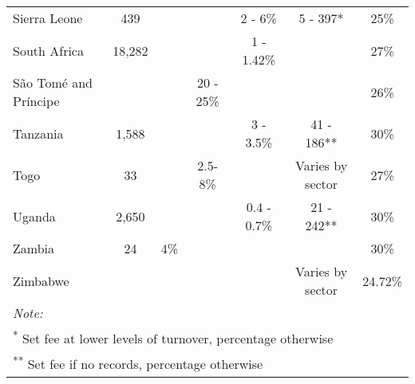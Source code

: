 \begin{tabular}{lcccccc}
Sierra Leone & 439 &  &  & 2 - 6\% & 5 - 397* & 25\%\\
South Africa & 18,282 &  &  & 1 - 1.42\% &  & 27\%\\
\addlinespace
São Tomé and Príncipe &  &  & 20 - 25\% &  &  & 26\%\\
Tanzania & 1,588 &  &  & 3 - 3.5\% & 41 - 186** & 30\%\\
Togo & 33 &  & 2.5- 8\% &  & Varies by sector & 27\%\\
Uganda & 2,650 &  &  & 0.4 - 0.7\% & 21 - 242** & 30\%\\
Zambia & 24 & 4\% &  &  &  & 30\%\\
\addlinespace
Zimbabwe &  &  &  &  & Varies by sector & 24.72\%\\
\bottomrule
\multicolumn{7}{l}{\rule{0pt}{1em}\textit{Note: }} \\
\multicolumn{7}{l}{\rule{0pt}{1em}\textsuperscript{*} Set fee at lower levels of turnover, percentage otherwise} \\
\multicolumn{7}{l}{\rule{0pt}{1em}\textsuperscript{**} Set fee if no records, percentage otherwise} \\
\end{tabular}
